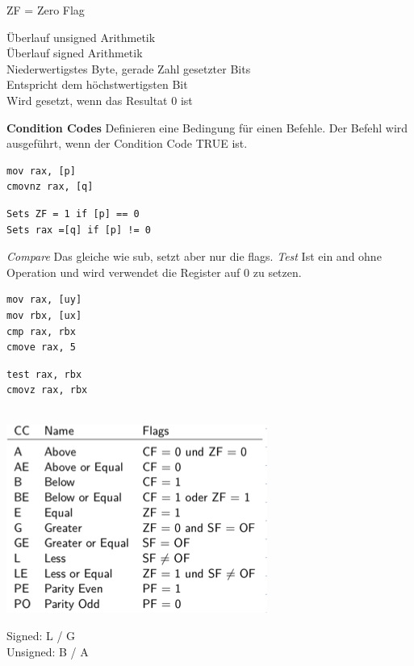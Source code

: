 \documentclass[7pt,landscape,a4paper]{scrartcl}
\begin{document}
\begin{multicols*}{4}
\begin{minipage}[b]{0,3\linewidth}
ZF = Zero Flag\\
\end{minipage}
\begin{minipage}[b]{0,7\linewidth}
Überlauf unsigned Arithmetik\\
Überlauf signed Arithmetik\\
Niederwertigstes Byte, gerade Zahl gesetzter Bits\\
Entspricht dem höchstwertigsten Bit\\
Wird gesetzt, wenn das Resultat 0 ist\\
\end{minipage}
\textbf{Condition Codes} Definieren eine Bedingung für einen Befehle. Der Befehl wird ausgeführt, wenn der Condition Code TRUE ist.\\
\begin{minipage}[b]{0,5\linewidth}
\begin{verbatim}
mov rax, [p]
cmovnz rax, [q]	
\end{verbatim}
\end{minipage}
\begin{minipage}[b]{0,5\linewidth}
\begin{verbatim}
Sets ZF = 1 if [p] == 0
Sets rax =[q] if [p] != 0 
\end{verbatim}
\end{minipage}
\textit{Compare} Das gleiche wie sub, setzt aber nur die flags.
\textit{Test} Ist ein and ohne Operation und wird verwendet die Register auf 0 zu setzen.\\
\begin{minipage}[b]{0,5\linewidth}
\begin{verbatim}
mov rax, [uy]
mov rbx, [ux]
cmp rax, rbx
cmove rax, 5
\end{verbatim}
\end{minipage}
\begin{minipage}[b]{0,5\linewidth}
\begin{verbatim}
test rax, rbx
cmovz rax, rbx
\end{verbatim}
\end{minipage}\\
\includegraphics[width=0.5\linewidth]{conditioncodes}
\begin{minipage}[b]{0,5\linewidth}
Signed: L / G\\
Unsigned: B / A
\end{minipage}


\end{multicols*}
\end{document}
